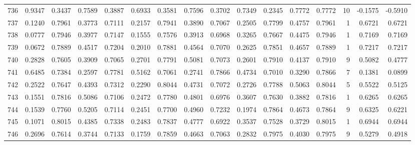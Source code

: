 \begin{tabular}{lrrrrrrrrrrrrrrr}
736 &      0.9347 &  0.3437 &  0.7589 &  0.3887 &  0.6933 &  0.3581 &  0.7596 &  0.3702 &  0.7349 &  0.2345 &   0.7772 &     0.7772 &     10 &                   -0.1575 &                    -0.5910 \\
737 &      0.1240 &  0.7961 &  0.3773 &  0.7111 &  0.2157 &  0.7941 &  0.3890 &  0.7067 &  0.2505 &  0.7799 &   0.4757 &     0.7961 &      1 &                    0.6721 &                     0.6721 \\
738 &      0.0777 &  0.7946 &  0.3977 &  0.7147 &  0.1555 &  0.7576 &  0.3913 &  0.6968 &  0.3265 &  0.7667 &   0.4475 &     0.7946 &      1 &                    0.7169 &                     0.7169 \\
739 &      0.0672 &  0.7889 &  0.4517 &  0.7204 &  0.2010 &  0.7881 &  0.4564 &  0.7070 &  0.2625 &  0.7851 &   0.4657 &     0.7889 &      1 &                    0.7217 &                     0.7217 \\
740 &      0.2828 &  0.7605 &  0.3909 &  0.7065 &  0.2701 &  0.7791 &  0.5081 &  0.7073 &  0.2601 &  0.7910 &   0.4137 &     0.7910 &      9 &                    0.5082 &                     0.4777 \\
741 &      0.6485 &  0.7384 &  0.2597 &  0.7781 &  0.5162 &  0.7061 &  0.2741 &  0.7866 &  0.4734 &  0.7010 &   0.3290 &     0.7866 &      7 &                    0.1381 &                     0.0899 \\
742 &      0.2522 &  0.7647 &  0.4393 &  0.7312 &  0.2290 &  0.8044 &  0.4731 &  0.7072 &  0.2726 &  0.7788 &   0.5063 &     0.8044 &      5 &                    0.5522 &                     0.5125 \\
743 &      0.1551 &  0.7816 &  0.5086 &  0.7106 &  0.2472 &  0.7780 &  0.4801 &  0.6976 &  0.3607 &  0.7630 &   0.3882 &     0.7816 &      1 &                    0.6265 &                     0.6265 \\
744 &      0.1539 &  0.7760 &  0.5205 &  0.7114 &  0.2451 &  0.7700 &  0.4960 &  0.7232 &  0.1974 &  0.7864 &   0.4673 &     0.7864 &      9 &                    0.6325 &                     0.6221 \\
745 &      0.1071 &  0.8015 &  0.4385 &  0.7338 &  0.2483 &  0.7837 &  0.4777 &  0.6922 &  0.3537 &  0.7528 &   0.3729 &     0.8015 &      1 &                    0.6944 &                     0.6944 \\
746 &      0.2696 &  0.7614 &  0.3744 &  0.7133 &  0.1759 &  0.7859 &  0.4663 &  0.7063 &  0.2832 &  0.7975 &   0.4030 &     0.7975 &      9 &                    0.5279 &                     0.4918 \\

\end{tabular}
